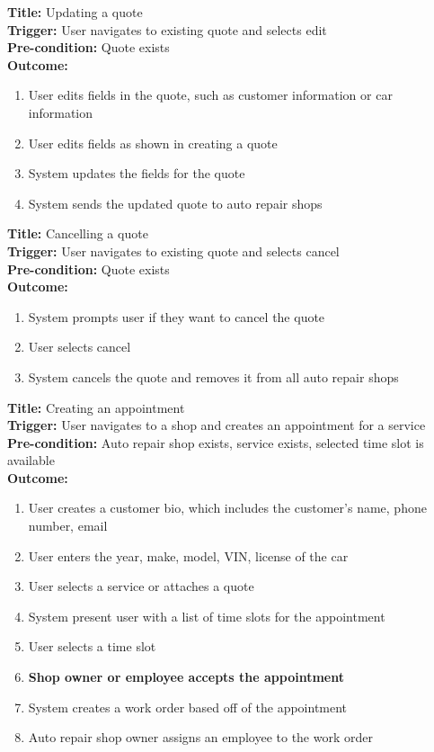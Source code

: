 \documentclass[12pt]{article}
\begin{document}
\textbf{Title:} Updating a quote\\
\textbf{Trigger:} User navigates to existing quote and selects edit\\
\textbf{Pre-condition:} Quote exists\\
\textbf{Outcome:}
\begin{enumerate}
	\item User edits fields in the quote, such as customer information or car information
	\item User edits fields as shown in creating a quote
	\item System updates the fields for the quote
	\item System sends the updated quote to auto repair shops
\end{enumerate}

\textbf{Title:} Cancelling a quote\\
\textbf{Trigger:} User navigates to existing quote and selects cancel\\
\textbf{Pre-condition:} Quote exists\\
\textbf{Outcome:}
\begin{enumerate}
	\item System prompts user if they want to cancel the quote
	\item User selects cancel
	\item System cancels the quote and removes it from all auto repair shops
\end{enumerate}

\textbf{Title:} Creating an appointment\\
\textbf{Trigger:} User navigates to a shop and creates an appointment for a service\\
\textbf{Pre-condition:} Auto repair shop exists, service exists, selected time slot is available\\
\textbf{Outcome:}
\begin{enumerate}
	\item User creates a customer bio, which includes the customer's name, phone number, email
	\item User enters the year, make, model, VIN, license of the car
	\item User selects a service or attaches a quote
	\item System present user with a list of time slots for the appointment
	\item User selects a time slot
	\item \textbf{Shop owner or employee accepts the appointment}
	\item System creates a work order based off of the appointment
	\item Auto repair shop owner assigns an employee to the work order
\end{enumerate}
\end{document}

